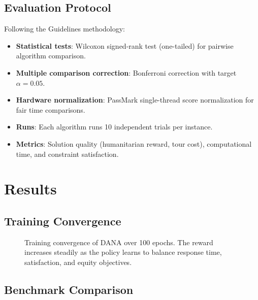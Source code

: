 \documentclass[12pt,a4paper]{article}
\begin{document}
\subsection{Evaluation Protocol}

Following the Guidelines methodology:

\begin{itemize}
	\item \textbf{Statistical tests}: Wilcoxon signed-rank test (one-tailed) for
	      pairwise algorithm comparison.
	\item \textbf{Multiple comparison correction}: Bonferroni correction with
	      target $\alpha = 0.05$.
	\item \textbf{Hardware normalization}: PassMark single-thread score
	      normalization for fair time comparisons.
	\item \textbf{Runs}: Each algorithm runs 10 independent trials per instance.
	\item \textbf{Metrics}: Solution quality (humanitarian reward, tour cost),
	      computational time, and constraint satisfaction.
\end{itemize}

\section{Results}

\subsection{Training Convergence}

\begin{figure}[ht]
	\centering
	\caption{Training convergence of DANA over 100 epochs. The reward increases
		steadily as the policy learns to balance response time, satisfaction, and
		equity objectives.}
	\label{fig:training_curve}
\end{figure}

\subsection{Benchmark Comparison}
\end{document}
